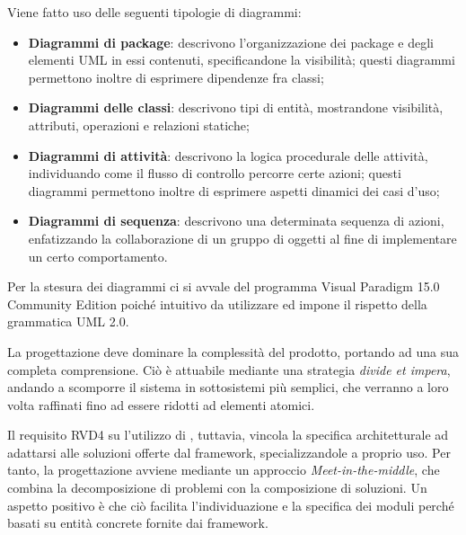 			Viene fatto uso delle seguenti tipologie di diagrammi:
				\begin{itemize}
					\item \textbf{Diagrammi di package}: descrivono l'organizzazione dei package e degli elementi UML in essi contenuti, specificandone la visibilità; questi diagrammi permettono inoltre di esprimere dipendenze fra classi;
					\item \textbf{Diagrammi delle classi}: descrivono tipi di entità, mostrandone visibilità, attributi, operazioni e relazioni statiche;
					\item \textbf{Diagrammi di attività}: descrivono la logica procedurale delle attività, individuando come il flusso di controllo percorre certe azioni; questi diagrammi permettono inoltre di esprimere aspetti dinamici dei casi d'uso;
					\item \textbf{Diagrammi di sequenza}: descrivono una determinata sequenza di azioni, enfatizzando la collaborazione di un gruppo di oggetti al fine di implementare un certo comportamento.
				\end{itemize}

			Per la stesura dei diagrammi ci si avvale del programma Visual Paradigm 15.0 Community Edition poiché intuitivo da utilizzare ed impone il rispetto della grammatica UML 2.0.

		\newpage


			La progettazione deve dominare la complessità del prodotto, portando ad una sua completa comprensione. Ciò è attuabile mediante una strategia \textit{divide et impera}, andando a scomporre il sistema in sottosistemi più semplici, che verranno a loro volta raffinati fino ad essere ridotti ad elementi atomici.

			Il requisito RVD4 su l'utilizzo di , tuttavia, vincola la specifica architetturale ad adattarsi alle soluzioni offerte dal framework, specializzandole a proprio uso.	Per tanto, la progettazione avviene mediante un approccio \textit{Meet-in-the-middle}, che combina la decomposizione di problemi con la composizione di soluzioni. Un aspetto positivo è che ciò facilita l'individuazione e la specifica dei moduli perché basati su entità concrete fornite dai framework.


